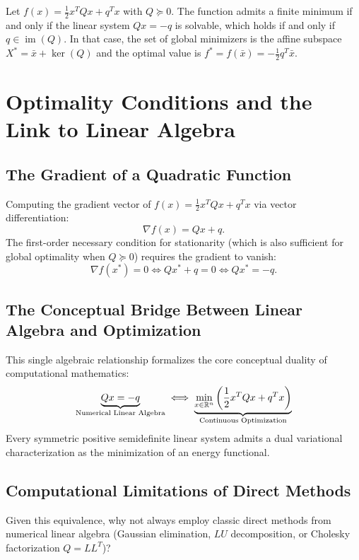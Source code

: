 \begin{theorem}
\label{thm:existence-minimum-psd}
Let $f(x) = \frac{1}{2} x^T Q x + q^T x$ with $Q \succeq 0$. The function admits a finite minimum if and only if the linear system $Qx = -q$ is solvable, which holds if and only if $q \in \operatorname{im}(Q)$.
In that case, the set of global minimizers is the affine subspace $X^* = \bar{x} + \ker(Q)$ and the optimal value is $f^* = f(\bar{x}) = -\frac{1}{2} q^T \bar{x}$.
\end{theorem}


\FloatBarrier
\section{Optimality Conditions and the Link to Linear Algebra}
\label{sec:optimality-conditions-linear-algebra}

\subsection{The Gradient of a Quadratic Function}
Computing the gradient vector of $f(x) = \frac{1}{2} x^T Q x + q^T x$ via vector differentiation:
\begin{equation}
    \nabla f(x) = Qx + q.
\end{equation}
The first-order necessary condition for stationarity (which is also sufficient for global optimality when $Q \succeq 0$) requires the gradient to vanish:
\begin{equation}
    \nabla f(x^*) = 0 \iff Q x^* + q = 0 \iff Q x^* = -q.
\end{equation}

\subsection{The Conceptual Bridge Between Linear Algebra and Optimization}
This single algebraic relationship formalizes the core conceptual duality of computational mathematics:
\begin{equation}
    \underbrace{Qx = -q}_{\text{Numerical Linear Algebra}} \iff \underbrace{\min_{x \in \mathbb{R}^n} \left(\frac{1}{2}x^T Qx + q^T x\right)}_{\text{Continuous Optimization}}
\end{equation}
Every symmetric positive semidefinite linear system admits a dual variational characterization as the minimization of an energy functional.

\subsection{Computational Limitations of Direct Methods}
Given this equivalence, why not always employ classic direct methods from numerical linear algebra (Gaussian elimination, $LU$ decomposition, or Cholesky factorization $Q = L L^T$)?

